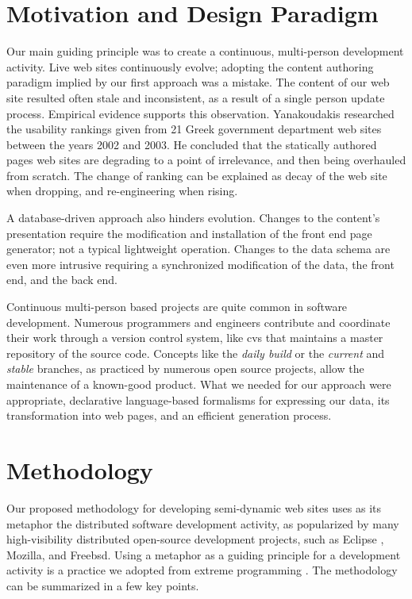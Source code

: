 \documentclass{elsart}
\begin{document}
\section{Motivation and Design Paradigm}
\label{sec:design}

Our main guiding principle was to create a continuous, multi-person 
development activity.
Live web sites continuously evolve;
adopting the content authoring paradigm implied
by our first approach was a mistake. The content of our web site resulted often stale and inconsistent, as a result 
of a single person update process.
Empirical evidence supports this observation.
Yanakoudakis \cite{G03} researched the usability rankings given from 21 Greek government department
web sites between the years 2002 and 2003. He concluded that 
the statically authored pages web sites are degrading to
a point of irrelevance, and then being overhauled from scratch.
The change of ranking can be explained as decay of the web site when dropping,
and re-engineering when rising.

A database-driven approach also hinders evolution.
Changes to the content's presentation require the modification
and installation of the front end page generator;
not a typical lightweight operation.
Changes to the data schema are even more intrusive
requiring a synchronized modification of the data,
the front end, and the back end.

Continuous multi-person based projects are quite
common in software development.
Numerous programmers and engineers contribute and coordinate their work
through a version control system, like {\sc cvs} \cite{BF01} that
maintains a master repository of the source code.
Concepts like the \textit{daily build} \cite{CS95b} or the
\textit{current} and \textit{stable} branches, as practiced by
numerous open source projects, allow the maintenance
of a known-good product.
What we needed for our approach were appropriate,
declarative language-based formalisms for expressing our data,
its transformation into web pages, and an efficient
generation process.

\section{Methodology}
\label{sec:meth}
Our proposed methodology for developing semi-dynamic web sites uses as
its metaphor the distributed software development activity, as popularized
by many high-visibility distributed open-source development projects,
such as Eclipse \cite{GB04}, Mozilla, and Free{\sc bsd}.
Using a metaphor as a guiding principle for a development activity
is a practice we adopted from extreme programming \cite{Bec00}.
The methodology can be summarized in a few key points.
\end{document}
